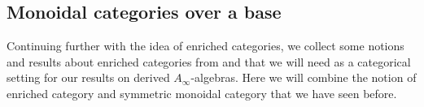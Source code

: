 \documentclass[Thesis.tex]{subfiles}
\begin{document}
\subsection{Monoidal categories over a base}




Continuing further with the idea of enriched categories, we collect some notions and results about enriched categories from \cite{riehl} and \cite[\S 4.2]{whitehouse} that we will need as a categorical setting for our results on derived $A_\infty$-algebras. Here we will combine the notion of enriched category and symmetric monoidal category that we have seen before.
\end{document}

